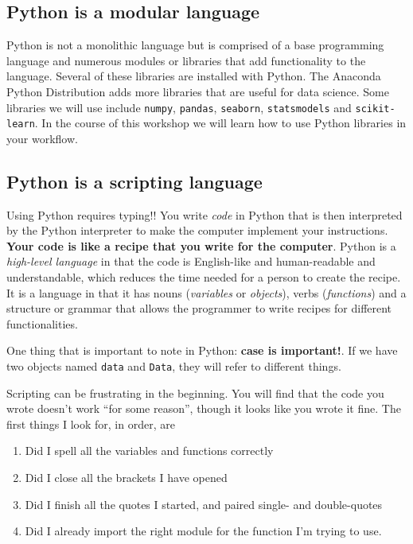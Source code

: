 \documentclass[
  letterpaper,
]{scrbook}
\providecommand{\tightlist}{%
  \setlength{\itemsep}{0pt}\setlength{\parskip}{0pt}}
\begin{document}
\hypertarget{python-is-a-modular-language}{%
\subsection{Python is a modular language}\label{python-is-a-modular-language}}

Python is not a monolithic language but is comprised of a base programming language and numerous modules or libraries that add functionality to the language. Several of these libraries are installed with Python. The Anaconda Python Distribution adds more libraries that are useful for data science. Some libraries we will use include \texttt{numpy}, \texttt{pandas}, \texttt{seaborn}, \texttt{statsmodels} and \texttt{scikit-learn}. In the course of this workshop we will learn how to use Python libraries in your workflow.

\hypertarget{python-is-a-scripting-language}{%
\subsection{Python is a scripting language}\label{python-is-a-scripting-language}}

Using Python requires typing!! You write \emph{code} in Python that is then interpreted by the Python interpreter to make the computer implement your instructions. \textbf{Your code is like a recipe that you write for the computer}. Python is a \emph{high-level language} in that the code is English-like and human-readable and understandable, which reduces the time needed for a person to create the recipe. It is a language in that it has nouns (\emph{variables} or \emph{objects}), verbs (\emph{functions}) and a structure or grammar that allows the programmer to write recipes for different functionalities.

One thing that is important to note in Python: \textbf{case is important!}. If we have two objects named \texttt{data} and \texttt{Data}, they will refer to different things.

Scripting can be frustrating in the beginning. You will find that the code you wrote doesn't work ``for some reason'', though it looks like you wrote it fine. The first things I look for, in order, are

\begin{enumerate}
\def\labelenumi{\arabic{enumi}.}
\tightlist
\item
  Did I spell all the variables and functions correctly
\item
  Did I close all the brackets I have opened
\item
  Did I finish all the quotes I started, and paired single- and double-quotes
\item
  Did I already import the right module for the function I'm trying to use.
\end{enumerate}
\end{document}
